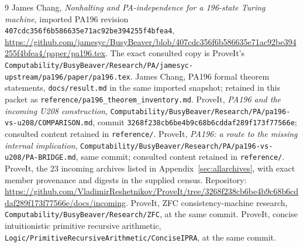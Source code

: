 \documentclass[11pt,letterpaper]{article}
\newcommand{\file}[1]{\texttt{\nolinkurl{#1}}}
\begin{document}


\begin{thebibliography}{9}
 James Chang, \emph{Nonhalting and PA-independence for a
196-state Turing machine}, imported PA196 revision
\file{407cdc356f6b586635e71ac92be394255f4bfea4},
\url{https://github.com/jamesyc/BusyBeaver/blob/407cdc356f6b586635e71ac92be394255f4bfea4/paper/pa196.tex}.
The exact consulted copy is ProveIt's
\file{Computability/BusyBeaver/Research/PA/jamesyc-upstream/pa196/paper/pa196.tex}.
 James Chang, PA196 formal theorem statements,
\file{docs/result.md} in the same imported snapshot; retained in this packet
as \file{reference/pa196_theorem_inventory.md}.
 ProveIt, \emph{PA196 and the incoming U208 construction},
\file{Computability/BusyBeaver/Research/PA/pa196-vs-u208/COMPARISON.md},
commit \file{3268f238cb6be4b9c68b6cddaf289f173f77566e}; consulted content retained in \file{reference/}.
 ProveIt, \emph{PA196: a route to the missing internal implication},
\file{Computability/BusyBeaver/Research/PA/pa196-vs-u208/PA-BRIDGE.md},
same commit; consulted content retained in \file{reference/}.
 ProveIt, the 23 incoming archives listed in
Appendix~\ref{sec:allarchives}, with exact member provenance and digests in
the supplied census. Repository:
\url{https://github.com/VladimirReshetnikov/ProveIt/tree/3268f238cb6be4b9c68b6cddaf289f173f77566e/docs/incoming}.
 ProveIt, ZFC consistency-machine research,
\file{Computability/BusyBeaver/Research/ZFC}, at the same commit.
 ProveIt, concise intuitionistic primitive recursive arithmetic,
\file{Logic/PrimitiveRecursiveArithmetic/ConciseIPRA}, at the same commit.
\end{thebibliography}
\end{document}
